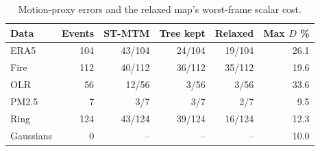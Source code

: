 \begin{table}[H]
\caption{Motion-proxy errors and the relaxed map's worst-frame scalar cost.}\label{tab:motion}
\centering\footnotesize
\setlength{\tabcolsep}{3pt}
\begin{tabular}{lrrrrr}\toprule
Data & Events & ST-MTM & Tree kept & Relaxed & Max $D$ \%\\\midrule
ERA5 & 104 & 43/104 & 24/104 & 19/104 & 26.1\\
Fire & 112 & 40/112 & 36/112 & 35/112 & 19.6\\
OLR & 56 & 12/56 & 3/56 & 3/56 & 33.6\\
PM2.5 & 7 & 3/7 & 3/7 & 2/7 & 9.5\\
Ring & 124 & 43/124 & 39/124 & 16/124 & 12.3\\
Gaussians & 0 & -- & -- & -- & 10.0\\
\bottomrule\end{tabular}
\par{}
\end{table}
